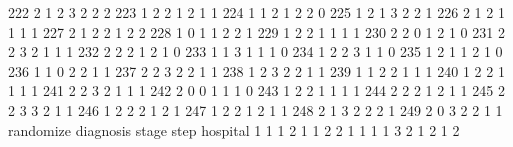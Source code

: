 \documentclass[
  letterpaper,
  DIV=11,
  numbers=noendperiod]{scrreprt}
\newenvironment{Shaded}{\begin{snugshade}}{\end{snugshade}}
\newcommand{\NormalTok}[1]{\textcolor[rgb]{0.00,0.23,0.31}{#1}}
\begin{document}
\begin{Shaded}
\begin{Highlighting}[]
\NormalTok{222              2     1         2            3        2         2      2}
\NormalTok{223              1     2         2            1        2         1      1}
\NormalTok{224              1     1         2            1        2         2      0}
\NormalTok{225              1     2         1            3        2         2      1}
\NormalTok{226              2     1         2            1        1         1      1}
\NormalTok{227              2     1         2            2        1         2      2}
\NormalTok{228              1     0         1            1        2         2      1}
\NormalTok{229              1     2         2            1        1         1      1}
\NormalTok{230              2     2         0            1        2         1      0}
\NormalTok{231              2     2         3            2        1         1      1}
\NormalTok{232              2     2         2            1        2         1      0}
\NormalTok{233              1     1         3            1        1         1      0}
\NormalTok{234              1     2         2            3        1         1      0}
\NormalTok{235              1     2         1            1        2         1      0}
\NormalTok{236              1     1         0            2        2         1      1}
\NormalTok{237              2     2         3            2        2         1      1}
\NormalTok{238              1     2         3            2        2         1      1}
\NormalTok{239              1     1         2            2        1         1      1}
\NormalTok{240              1     2         2            1        1         1      1}
\NormalTok{241              2     2         3            2        1         1      1}
\NormalTok{242              2     0         0            1        1         1      0}
\NormalTok{243              1     2         2            1        1         1      1}
\NormalTok{244              2     2         2            1        2         1      1}
\NormalTok{245              2     2         3            3        2         1      1}
\NormalTok{246              1     2         2            2        1         2      1}
\NormalTok{247              1     2         2            1        2         1      1}
\NormalTok{248              2     1         3            2        2         2      1}
\NormalTok{249              2     0         3            2        2         1      1}
\NormalTok{    randomize diagnosis stage step hospital}
\NormalTok{1           1         1     2    1        1}
\NormalTok{2           2         1     1    1        1}
\NormalTok{3           2         1     2    1        2}

\end{Highlighting}
\end{Shaded}
\end{document}
